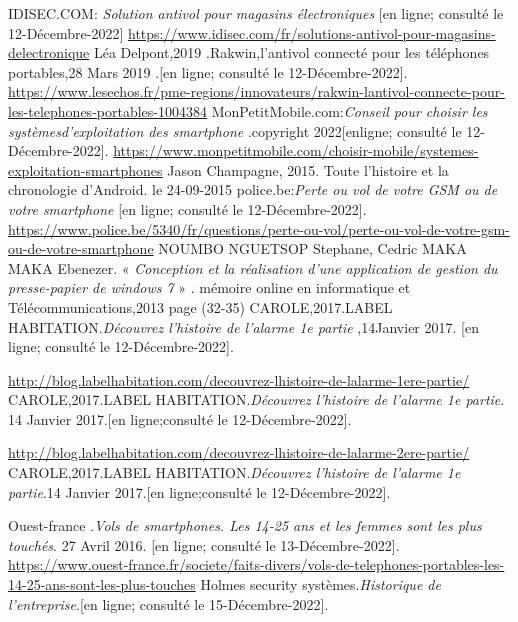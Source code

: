 \documentclass[a4paper, 12pt]{article}
\begin{document}
\newpage
\begin{thebibliography}{9}


IDISEC.COM: \textit{Solution antivol pour magasins électroniques }[en ligne; consulté le 12-Décembre-2022] \url{https://www.idisec.com/fr/solutions-antivol-pour-magasins-delectronique}
Léa Delpont,2019 .Rakwin,l'antivol connecté pour les téléphones portables,28 Mars 2019 .[en ligne; consulté le 12-Décembre-2022]. \url{https://www.lesechos.fr/pme-regions/innovateurs/rakwin-lantivol-connecte-pour-les-telephones-portables-1004384}
MonPetitMobile.com:\textit{Conseil pour choisir les systèmesd'exploitation des smartphone }.copyright 2022[enligne; consulté le 12-Décembre-2022].
 \url{https://www.monpetitmobile.com/choisir-mobile/systemes-exploitation-smartphones}
Jason Champagne, 2015. Toute l’histoire et la chronologie d’Android. le 24-09-2015 
police.be:\textit{Perte ou vol de votre GSM ou de votre smartphone} [en ligne; consulté le 12-Décembre-2022]. 
\url{https://www.police.be/5340/fr/questions/perte-ou-vol/perte-ou-vol-de-votre-gsm-ou-de-votre-smartphone}
NOUMBO NGUETSOP Stephane, Cedric MAKA MAKA Ebenezer. « \textit{Conception et la réalisation d'une application de gestion du presse-papier de windows 7 }» . mémoire  online en informatique et Télécommunications,2013 page (32-35)
CAROLE,2017.LABEL HABITATION.\textit{Découvrez l'histoire de l'alarme 1e partie },14Janvier 2017. [en ligne; consulté le 12-Décembre-2022].

\url{http://blog.labelhabitation.com/decouvrez-lhistoire-de-lalarme-1ere-partie/}
CAROLE,2017.LABEL HABITATION.\textit{Découvrez l'histoire de l'alarme 1e partie}. 14 Janvier 2017.[en ligne;consulté le 12-Décembre-2022].

\url{http://blog.labelhabitation.com/decouvrez-lhistoire-de-lalarme-2ere-partie/}
CAROLE,2017.LABEL HABITATION.\textit{Découvrez l'histoire de l'alarme 1e partie}.14 Janvier 2017.[en ligne;consulté le 12-Décembre-2022].

Ouest-france .\textit{Vols de smartphones. Les 14-25 ans et les femmes sont les plus touchés}. 27 Avril 2016. [en ligne; consulté le 13-Décembre-2022].
\url{https://www.ouest-france.fr/societe/faits-divers/vols-de-telephones-portables-les-14-25-ans-sont-les-plus-touches}
Holmes security systèmes.\textit{Historique de l'entreprise}.[en ligne; consulté le 15-Décembre-2022].


\end{thebibliography}
\end{document}
